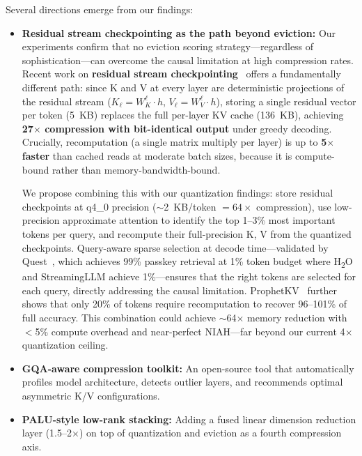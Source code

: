 Several directions emerge from our findings:
\begin{itemize}
    \item \textbf{Residual stream checkpointing as the path beyond eviction:} Our experiments confirm that no eviction scoring strategy---regardless of sophistication---can overcome the causal limitation at high compression rates. Recent work on \textbf{residual stream checkpointing}~\citep{kvdirect2026} offers a fundamentally different path: since K and V at every layer are deterministic projections of the residual stream ($K_\ell = W_K^\ell \cdot h$, $V_\ell = W_V^\ell \cdot h$), storing a single residual vector per token (5~KB) replaces the full per-layer KV cache (136~KB), achieving \textbf{27$\times$ compression with bit-identical output} under greedy decoding. Crucially, recomputation (a single matrix multiply per layer) is up to \textbf{5$\times$ faster} than cached reads at moderate batch sizes, because it is compute-bound rather than memory-bandwidth-bound.

    We propose combining this with our quantization findings: store residual checkpoints at q4\_0 precision ($\sim$2~KB/token $= 64\times$ compression), use low-precision approximate attention to identify the top 1--3\% most important tokens per query, and recompute their full-precision K, V from the quantized checkpoints. Query-aware sparse selection at decode time---validated by Quest~\citep{quest2024}, which achieves 99\% passkey retrieval at 1\% token budget where H\textsubscript{2}O and StreamingLLM achieve 1\%---ensures that the right tokens are selected for each query, directly addressing the causal limitation. ProphetKV~\citep{prophetkv2025} further shows that only 20\% of tokens require recomputation to recover 96--101\% of full accuracy. This combination could achieve $\sim$64$\times$ memory reduction with $<$5\% compute overhead and near-perfect NIAH---far beyond our current 4$\times$ quantization ceiling.
    \item \textbf{GQA-aware compression toolkit:} An open-source tool that automatically profiles model architecture, detects outlier layers, and recommends optimal asymmetric K/V configurations.
    \item \textbf{PALU-style low-rank stacking:} Adding a fused linear dimension reduction layer (1.5--2$\times$) on top of quantization and eviction as a fourth compression axis.
\end{itemize}
